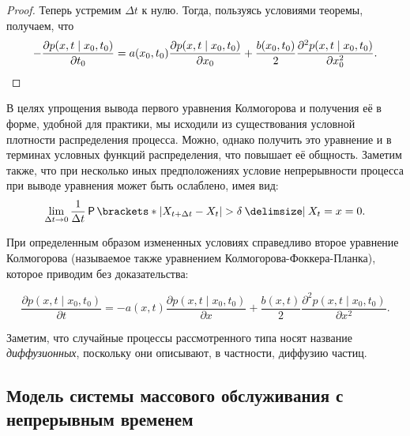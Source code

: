 \begin{proof}
	Теперь устремим \(\Delta t\) к нулю. Тогда, пользуясь условиями теоремы, 
	получаем, что
	\[
		-\frac{\partial p(x, t \mid x_{0}, t_{0})}{\partial t_{0}} = a(x_{0}, 
		t_{0})\frac{\partial p(x, t \mid x_{0}, t_{0})}{\partial x_{0}} + 
		\frac{b(x_{0}, t_{0})}{2}\frac{\partial^{2} p(x, t \mid x_{0}, 
		t_{0})}{\partial x_{0}^{2}}. \qedhere
	\]
\end{proof}

В целях упрощения вывода первого уравнения Колмогорова и получения её в форме, 
удобной для практики, мы исходили из существования условной плотности 
распределения процесса. Можно, однако получить это уравнение и в терминах 
условных функций распределения, что повышает её общность. Заметим также, что 
при несколько иных предположениях условие непрерывности процесса при выводе
уравнения может быть ослаблено, имея вид:
\[
	\lim\limits_{\Delta t \to 0} \frac{1}{\Delta t}\Pr{|X_{t + \Delta t} - 
	X_{t}| > \delta \given X_{t} = x} = 0.
\]

При определенным образом измененных условиях справедливо второе уравнение 
Колмогорова (называемое также уравнением Колмогорова-Фоккера-Планка), которое 
приводим без доказательства:
\begin{theorem}
	\[
		\frac{\partial p(x, t \mid x_{0}, t_{0})}{\partial t} = -a(x, 
		t)\frac{\partial p(x, t \mid x_{0}, t_{0})}{\partial x} + 
		\frac{b(x, t)}{2}\frac{\partial^{2} p(x, t \mid x_{0}, 
			t_{0})}{\partial x^{2}}.
	\]
\end{theorem}

Заметим, что случайные процессы рассмотренного типа носят название 
\emph{диффузионных}, поскольку они описывают, в частности, диффузию частиц.

\subsection{Модель системы массового обслуживания с непрерывным временем}

